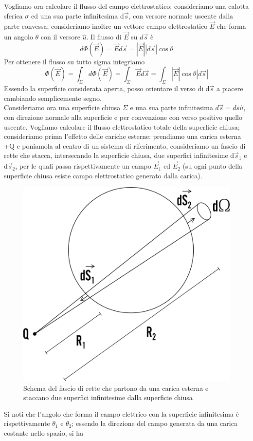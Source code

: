 \documentclass[10pt,a4paper]{article}
\begin{document}
Vogliamo ora calcolare il flusso del campo elettrostatico: consideriamo una calotta sferica \(\sigma\) ed una sua parte infinitesima d$\vec{s}$, con versore normale uscente dalla parte convessa; consideriamo inoltre un vettore campo elettrostatico $\vec{E}$ che forma un angolo \(\theta\) con il versore $\hat{u}$. Il flusso di $\vec{E}$ su \(d\vec{s}\) è 
\[d\Phi(\vec{E}) = \vec{E}d\vec{s} = |\vec{E}||d\vec{s}|\cos\theta\]
Per ottenere il flusso su tutto sigma integriamo 
\[\Phi(\vec{E}) = \int_{\Sigma}d\Phi(\vec{E}) = \int_{\Sigma}\vec{E}d\vec{s} = \int_{\Sigma}|\vec{E}|\cos\theta|d\vec{s}|\]
Essendo la superficie considerata aperta, posso orientare il verso di d$\vec{s}$ a piacere cambiando semplicemente segno.\\
Consideriamo ora una superficie chiusa $\Sigma$ e una sua parte infinitesima $d\vec{s} = ds \hat{u}$, con direzione normale alla superficie e per convenzione con verso positivo quello uscente. Vogliamo calcolare il flusso elettrostatico totale della superficie chiusa; consideriamo prima l'effetto delle cariche esterne: prendiamo una carica esterna +Q e poniamola al centro di un sistema di riferimento, consideriamo un fascio di rette che stacca, intersecando la superficie chiusa, due superfici infinitesime d$\vec{s}_1$ e d$\vec{s}_2$, per le quali passa rispettivamente un campo $\vec{E}_1$ ed $\vec{E}_2$ (su ogni punto della superficie chiusa esiste campo elettrostatico generato dalla carica).  
\begin{figure}[h!]
	\centering
	\includegraphics[width=0.5\linewidth]{images/thm_gauss_1}
	\caption{Schema del fascio di rette che partono da una carica esterna e staccano due superfici infinitesime dalla superficie chiusa}
	\label{fig:thmgauss1}
\end{figure}
\FloatBarrier
Si noti che l'angolo che forma il campo elettrico con la superficie infinitesima è rispettivamente \(\theta_1\) e \(\theta_2\); essendo la direzione del campo generata da una carica costante nello spazio, si ha
\end{document}
